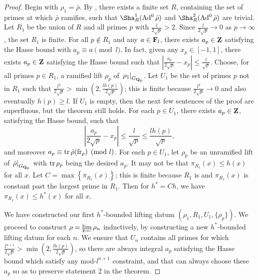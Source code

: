 \begin{proof}
Begin with $\rho_1= \bar\rho$. By \cite[Lem.~6]{khare-larsen-ramakrishna-2005}, 
there exists a finite set $R$, containing the set of primes at which $\bar\rho$ 
ramifies, such that $\Sha_R^1(\Ad^0\bar\rho)$ and $\Sha_R^2(\Ad^0\bar\rho)$ are 
trivial. 
Let $R_1$ be the union of $R$ and all primes $p$ with 
$\frac{l}{2\sqrt p} > 2$. Since $\frac{l}{2\sqrt p} \to 0$ as $p\to \infty$, 
the set $R_1$ is finite. For all $p\notin R_1$ and any $a\in \mathbf{F}_l$, there 
exists $a_p\in \mathbf{Z}$ satisfying the Hasse bound with $a_p\equiv a\pmod l$. In 
fact, given any $x_p\in [-1,1]$, there exists $a_p\in \mathbf{Z}$ satisfying the Hasse 
bound such that 
$\left| \frac{a_p}{2\sqrt p} - x_p\right| \leqslant \frac{l}{\sqrt p}$.
Choose, for all primes $p\in R_1$, a ramified 
lift $\rho_p$ of $\left. \rho_1\right|_{G_{\mathbf{Q}_p}}$. Let $U_1$ be the set of 
primes $p$ not in $R_1$ such that 
$\frac{l^2}{2\sqrt p} > \min\left(2, \frac{l h(p)}{2\sqrt p}\right)$; this is 
finite because $\frac{l^2}{2\sqrt p} \to 0$ and also eventually 
$h(p) \geqslant l$. If $U_1$ is empty, then the next few sentences of the 
proof are superfluous, but the theorem still holds. 
For each $p\in U_1$, there exists $a_p\in \mathbf{Z}$, satisfying the 
Hasse bound, such that 
\[
	\left| \frac{a_p}{2\sqrt p} - x_p\right| \leqslant \frac{l}{\sqrt p} \leqslant \frac{l h(p)}{\sqrt p} ,
\]
and moreover $a_p\equiv \operatorname{tr}\bar\rho(\mathrm{fr}_p)\pmod l$. For each $p\in U_1$, let 
$\rho_p$ be an unramified lift of $\left.\bar\rho\right|_{G_{\mathbf{Q}_p}}$ with 
$\operatorname{tr}\rho_p$ being the desired $a_p$. It may not be that 
$\pi_{R_1}(x) \leqslant h(x)$ for all $x$. Let 
$C = \max\left\{\pi_{R_1}(x)\right\}$; this is finite because 
$R_1$ is and $\pi_{R_1}(x)$ is constant past the largest prime in $R_1$. Then 
for $h^\ast = C h$, we have $\pi_{R_1}(x) \leqslant h^\ast(x)$ for all $x$. 

We have constructed our first $h^\ast$-bounded lifting datum 
$(\rho_1,R_1,U_1,\{\rho_p\})$. We proceed to construct 
$\rho = \varprojlim \rho_n$ inductively, by constructing a new $h^\ast$-bounded 
lifting datum for each $n$. We ensure that $U_n$ contains all primes for which 
$\frac{l^{n+1}}{2\sqrt p} > \min\left(2, \frac{l h(p)}{2\sqrt p}\right)$, so 
there are always integral $a_p$ satisfying the Hasse bound which satisfy any 
mod-$l^{n+1}$ constraint, and that can always choose these $a_p$ so as to 
preserve statement 2 in the theorem. 


\end{proof}
